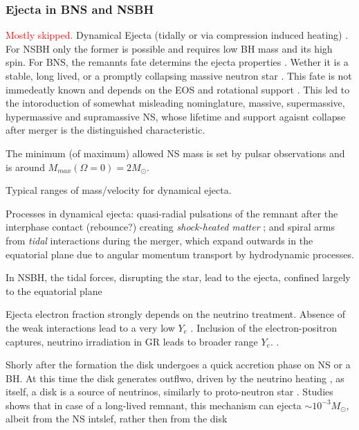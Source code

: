 \documentclass[11pt,a4paper,headinclude=true,DIV=14,BCOR=8mm,chapterprefix,listof=totoc,twoside,openright,abstracton]{scrbook}
\newcommand{\red}[1]{\textcolor{red}{#1}}
\begin{document}
\subsubsection{Ejecta in BNS and NSBH}
\red{Mostly skipped.}
Dynamical Ejecta (tidally or via compression induced heating) \cite{Fernandez and Metzger 2016}. For NSBH only the former is possible and requires low BH mass and its high spin. \cite{(Foucart 2012)}
For BNS, the remannts fate determins the ejecta properties \cite{(Shibata and Uryu 2000; Shibata and Taniguchi 2006).}. Wether it is a stable, long lived, or a promptly collapsing massive neutron star \cite{(Hotokezaka et al 2011; Bauswein et al 2013a).}. This fate is not immedeatly known and depends on the EOS and rotational support \cite{(Baumgarte et al 2000; Ozel et al 2010; Kaplan et al 2014)}. This led to the intoroduction of somewhat misleading nominglature, massive, supermassive, hypermassive and supramassive NS, whose lifetime and support agaisnt collapse after merger is the distinguished characteristic.

The minimum (of maximum) allowed NS mass is set by pulsar observations \cite{(Demorest et al 2010; Antoniadis et al 2013)} and is around $M_{max}(\Omega=0) = 2M_{\odot}$.

Typical ranges of mass/velocity for dynamical ejecta.

Processes in dynamical ejecta: quasi-radial pulsations of the remnant after the interphase contact (rebounce?) creating \textit{shock-heated matter} \cite{(Oechslin et al 2007; Bauswein et al 2013a; Hotokezaka et al 2013a)}; and spiral arms from \textit{tidal} interactions during the merger, which expand outwards in the equatorial plane due to angular momentum transport by hydrodynamic processes.

In NSBH, the tidal forces, disrupting the star, lead to the ejecta, confined largely to the equatorial plane \cite{(Kawaguchi et al 2015)}

Ejecta electron fraction strongly depends on the neutrino treatment. Absence of the weak interactions lead to a very low $Y_e$ \cite{(Goriely et al 2011; Korobkin et al 2012; Bauswein et al 2013a; Mendoza-Temis et al 2015).}. Inclusion of the electron-positron captures, neutrino irradiation in GR leads to broader range $Y_e$. \cite{(Sekiguchi et al 2015; Radice et al 2016).}. 


Shorly after the formation the disk undergoes a quick accretion phase on NS or a BH. At this time the disk generates outflwo, driven by the neutrino heating \cite{(Surman et al 2008; Metzger et al 2008d)}, as itself, a disk is a source of neutrinos, similarly to proto-neutron star \cite{(Popham et al 1999)}.
Studies shows that in case of a long-lived remnant, this mechanism can ejecta $\sim10^{-3}M_{\odot}$, albeit from the NS intslef, rather then from the disk \cite{Dessart et al 2009; Perego et al 2014; Martin et al 2015; Richers et al 2015)}
\end{document}
